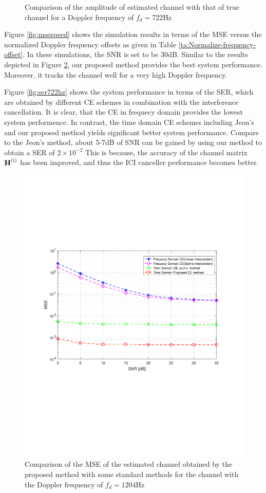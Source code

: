 \documentclass[12pt,journal,draftclsnofoot,onecolumn]{IEEEtran}
\begin{document}
{{{\begin{figure}
	\caption{Comparison of the amplitude of estimated channel with that of true channel for a Doppler frequency of $f_{d}=722$Hz}
	\label{fig:cir722hz}
\end{figure}
%		
Figure \ref{fig:msespeed} shows the simulation results in terms of the MSE versus the normalized Doppler frequency offsets as given in Table \ref{ta:Normalize-frequency-offset}. In these simulations, the SNR is set to be 30dB. Similar to the results depicted in Figure \ref{fig:1204hz}, our proposed method provides the best system performance. Moreover, it tracks the channel well for a very high Doppler frequency.
				
Figure \ref{fig:ser722hz} shows the system performance in terms of the SER, which are obtained by different CE schemes in combination with the interference cancellation. It is clear, that the CE in frequecy domain provides the lowest system performence. In contrast, the time domain CE schemes including Jeon's and our proposed method yields significant better system performance. 
Compare to the Jeon's method, about  5-7dB of SNR can be gained by using our method to obtain a SER of  $2\times 10^{-2}$  This is because, the accuracy of the channel matrix  $\rm{\textbf H^{(i)}}$ has been improved, and thus the ICI canceller performance becomes better. 
%				
\begin{figure}
	\centering
	\includegraphics[width=1.0\linewidth]{figures/mse_1204Hz}
	\caption{Comparison of the MSE of the estimated channel obtained by the proposed	method with some standard methods for the channel with the Doppler frequency of $f_{d}=1204$Hz}
	\label{fig:1204hz}
\end{figure}
				
}}}
\end{document}
